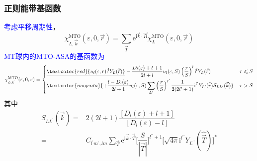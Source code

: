 \frame
{
	\frametitle{正则能带基函数}

	\textcolor{blue}{考虑平移周期性}，
$$\chi_{L,\vec k}^{\mathrm{MTO}}(\varepsilon,0,\vec r)=\sum_{\vec T}\mathrm{e}^{\mathrm{i}\vec k\cdot\vec R}\chi_L^{\mathrm{MTO}}(\varepsilon,0,\vec r)$$
\textcolor{blue}{\textrm{MT}球内的\textrm{MTO-ASA}的基函数为}
{\fontsize{7.0pt}{5.2pt}\selectfont
\begin{displaymath}
\chi_{L,\vec k}^{\mathrm{MTO}}(\varepsilon,0,\vec r)=\left\{
	\begin{aligned}
		&\underline{\textcolor{red}{u_l(\varepsilon,r)\mathrm{i}^lY_L(\hat{\vec r})}}-\dfrac{D_l(\varepsilon)+l+1}{2l+l}u_l(\varepsilon,S)\left(\dfrac rS\right)^l\mathrm{i}^lY_L(\hat{\vec r})&\, r\leqslant S\\
		&\textcolor{magenta}{+\dfrac{l-D_l(\varepsilon)}{2l+1}u_l(\varepsilon,S)\sum_{L^{\prime}}\left(\dfrac rS\right)^{l^{\prime}}\dfrac1{2(2l^{\prime}+1)}\mathrm{i}^{l^{\prime}}Y_{L^{\prime}}(\hat{\vec r})S_{LL^{\prime}}(\vec k)}&\, r>S
	\end{aligned}\right.
\end{displaymath}}
其中
\begin{displaymath}
	\begin{aligned}
		S_{LL^{\prime}}(\vec k)=&2(2l+1)\dfrac{[D_l(\varepsilon)+l+1]}{[D_l(\varepsilon)-l]}\\
		=&C_{l^{\prime}m^{\prime},lm}\sum_{\vec T}\mathrm{e}^{\mathrm{i}\vec k\cdot\vec T}\bigg[\dfrac S{|\vec T|}\bigg]^{l^{\prime\prime}+1}\big[\sqrt{4\pi}\mathrm{i}^{l^{\prime\prime}}Y_{L^{\prime\prime}}(\hat{\vec T})\big]^{\ast}
	\end{aligned}
\end{displaymath}
}

